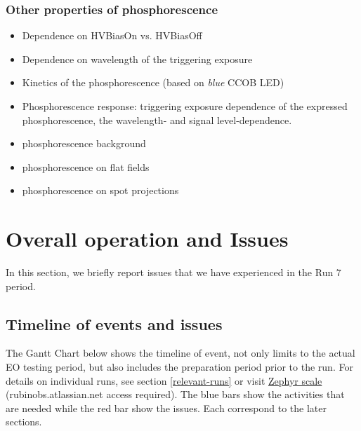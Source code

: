 \subsubsection{Other properties of phosphorescence}
\begin{itemize}
\tightlist
\item
  Dependence on HVBiasOn vs. HVBiasOff
\item
  Dependence on wavelength of the triggering exposure
\item
  Kinetics of the phosphorescence (based on {\it blue} CCOB LED)
  \item 
  Phosphorescence response: triggering exposure dependence of the expressed phosphorescence, the wavelength- and signal level-dependence. 
\end{itemize}


\begin{itemize}
\tightlist
\item
  phosphorescence background
\item
  phosphorescence on flat fields
\item
  phosphorescence on spot projections
\end{itemize}

\clearpage

\section{Overall operation and Issues}\label{sec:issues}
In this section, we briefly report issues that we have experienced in the Run 7 period.

\subsection{Timeline of events and issues}

The Gantt Chart below shows the timeline of event, not only limits to the actual EO testing period, but also includes the preparation period prior to the run. For details on individual runs, see section \ref{relevant-runs} or visit \href{https://rubinobs.atlassian.net/projects/BLOCK?selectedItem=com.atlassian.plugins.atlassian-connect-plugin:com.kanoah.test-manager__main-project-page#!/reports/testresults/list/view?tql=testResult.projectId%20IN%20(10064)%20AND%20testPlan.key%20IN%20(%22BLOCK-P15%22)%20AND%20testPlan.onlyLastTestResult%20IS%20true&epicJQL=&title=Test%20execution%20results%20(list)&projectId=10064&traceabilityReportOption=COVERAGE_TEST_CASES&traceabilityTreeOption=COVERAGE_TEST_CASES&traceabilityCustomTreeDisplayOption=CONDENSED&traceabilityMatrixOption=COVERAGE_TEST_CASES&scorecardOption=EXECUTION_RESULTS&displayUnit=COUNT&period=MONTH}{Zephyr scale} (rubinobs.atlassian.net access required).
The blue bars show the activities that are needed while the red bar show the issues. Each correspond to the later sections.

